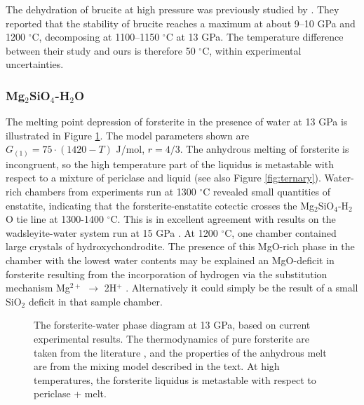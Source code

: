 \documentclass[review]{elsarticle}
\begin{document}
The dehydration of brucite at high pressure was previously studied by \cite{FIYKFO2005}. They reported that the stability of brucite reaches a maximum at about 9--10 GPa and 1200 $^{\circ}$C, decomposing at 1100--1150 $^{\circ}$C at 13 GPa. The temperature difference between their study and ours is therefore 50 $^{\circ}$C, within experimental uncertainties. 


\clearpage
\subsubsection{Mg$_2$SiO$_4$-H$_2$O}
The melting point depression of forsterite in the presence of water at 13 GPa is illustrated in Figure \ref{fig:foH}. The model parameters shown are $G_{(1)} = 75 \cdot (1420-T)$ J/mol, $r=4/3$. The anhydrous melting of forsterite is incongruent, so the high temperature part of the liquidus is metastable with respect to a mixture of periclase and liquid (see also Figure \ref{fig:ternary}). Water-rich chambers from experiments run at 1300 $^{\circ}$C revealed small quantities of enstatite, indicating that the forsterite-enstatite cotectic crosses the Mg$_2$SiO$_4$-H$_2$O tie line at 1300-1400 $^{\circ}$C. This is in excellent agreement with results on the wadsleyite-water system run at 15 GPa \citep{DDFK2005, LSOK2011}. At 1200 $^{\circ}$C, one chamber contained large crystals of hydroxychondrodite. The presence of this MgO-rich phase in the chamber with the lowest water contents may be explained an MgO-deficit in forsterite resulting from the incorporation of hydrogen via the substitution mechanism Mg$^{2+}$ $\rightarrow$ 2H$^+$ \citep{KB2006}. Alternatively it could simply be the result of a small SiO$_2$ deficit in that sample chamber. 

\begin{figure}[ht!]
  \centering
      \caption{The forsterite-water phase diagram at 13 GPa, based on current experimental results. The thermodynamics of pure forsterite are taken from the literature \citep{SLB2011}, and the properties of the anhydrous melt are from the mixing model described in the text. At high temperatures, the forsterite liquidus is metastable with respect to periclase + melt.}
  \label{fig:foH}
\end{figure}
\clearpage
\end{document}

